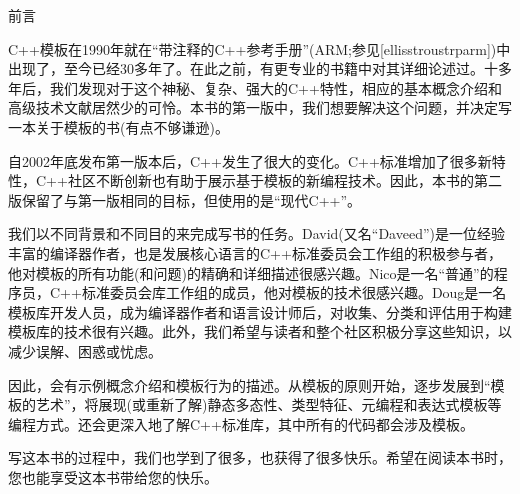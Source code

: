 
\begin{flushright}
 前言
\end{flushright}

C++模板在1990年就在“带注释的C++参考手册”(ARM;参见[ellisstroustrparm])中出现了，至今已经30多年了。在此之前，有更专业的书籍中对其详细论述过。十多年后，我们发现对于这个神秘、复杂、强大的C++特性，相应的基本概念介绍和高级技术文献居然少的可怜。本书的第一版中，我们想要解决这个问题，并决定写一本关于模板的书(有点不够谦逊)。

自2002年底发布第一版本后，C++发生了很大的变化。C++标准增加了很多新特性，C++社区不断创新也有助于展示基于模板的新编程技术。因此，本书的第二版保留了与第一版相同的目标，但使用的是“现代C++”。

我们以不同背景和不同目的来完成写书的任务。David(又名“Daveed”)是一位经验丰富的编译器作者，也是发展核心语言的C++标准委员会工作组的积极参与者，他对模板的所有功能(和问题)的精确和详细描述很感兴趣。Nico是一名“普通”的程序员，C++标准委员会库工作组的成员，他对模板的技术很感兴趣。Doug是一名模板库开发人员，成为编译器作者和语言设计师后，对收集、分类和评估用于构建模板库的技术很有兴趣。此外，我们希望与读者和整个社区积极分享这些知识，以减少误解、困惑或忧虑。

因此，会有示例概念介绍和模板行为的描述。从模板的原则开始，逐步发展到“模板的艺术”，将展现(或重新了解)静态多态性、类型特征、元编程和表达式模板等编程方式。还会更深入地了解C++标准库，其中所有的代码都会涉及模板。

写这本书的过程中，我们也学到了很多，也获得了很多快乐。希望在阅读本书时，您也能享受这本书带给您的快乐。